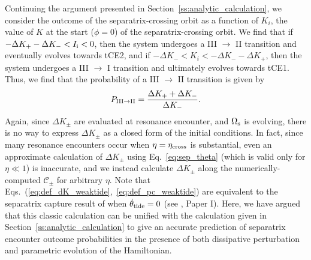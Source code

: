 \documentclass[
        fleqn,
        usenatbib,
        referee
    ]{mnras}
\begin{document}
Continuing the argument presented in Section~\ref{ss:analytic_calculation}, we
consider the outcome of the separatrix-crossing orbit as a function of $K_i$,
the value of $K$ at the start ($\phi = 0$) of the separatrix-crossing orbit. We
find that if $-\Delta K_+ - \Delta K_- < I_{\rm i} < 0$, then the system
undergoes a III $\to$ II transition and eventually evolves towards tCE2, and
if $-\Delta K_- < K_i < -\Delta K_- - \Delta K_+$, then the system undergoes a
III $\to$ I transition and ultimately evolves towards tCE1. Thus, we find that
the probability of a III $\to$ II transition is given by
\begin{equation}
    P_{\rm III \to II} = \frac{\Delta K_+ + \Delta K_-}{\Delta
        K_-}.\label{eq:def_pc_weaktide}
\end{equation}
Again, since $\Delta K_{\pm}$ are evaluated at resonance encounter, and
$\Omega_{\rm s}$ is evolving, there is no way to express $\Delta K_{\pm}$ as a
closed form of the initial conditions. In fact, since many resonance encounters
occur when $\eta = \eta_{\rm cross}$ is substantial, even an approximate
calculation of $\Delta K_{\pm}$ using Eq.~\eqref{eq:sep_theta} (which is valid
only for $\eta \ll 1$) is inaccurate, and we instead calculate $\Delta K_{\pm}$
along the numerically-computed $\mathcal{C}_{\pm}$ for arbitrary $\eta$. Note
that Eqs.~(\ref{eq:def_dK_weaktide},~\ref{eq:def_pc_weaktide}) are equivalent to
the separatrix capture result of \citet{henrard1982} when $\dot{\theta}_{\rm
tide} = 0$ (see \citealp{henrard1987}, Paper I). Here, we have argued that this
classic calculation can be unified with the calculation given in
Section~\ref{ss:analytic_calculation} to give an accurate prediction of
separatrix encounter outcome probabilities in the presence of both dissipative
perturbation and parametric evolution of the Hamiltonian.
\end{document}
